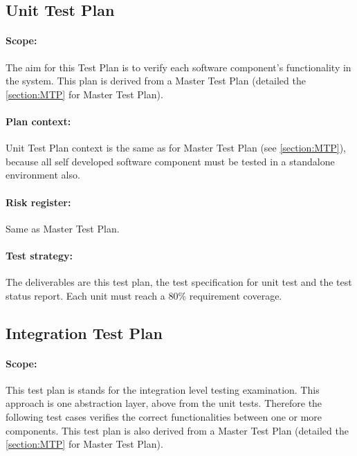 \subsection{Unit Test Plan}\label{ssection:UTP}
\paragraph{Scope:} The aim for this Test Plan is to verify each software component's functionality in the system. This plan is derived from a Master Test Plan (detailed the \autoref{section:MTP} for Master Test Plan). 
\paragraph{Plan context:} Unit Test Plan context is the same as for Master Test Plan (see \autoref{section:MTP}), because all self developed software component must be tested in a standalone environment also. 
\paragraph{Risk register:} Same as Master Test Plan.
\paragraph{Test strategy:} The deliverables are this test plan, the test specification for unit test and the test status report. Each unit must reach a 80\%  requirement coverage. 


\subsection{Integration Test Plan}\label{ssection:ITP}
\paragraph{Scope:} This test plan is stands for the integration level testing examination. This approach is one abstraction layer, above from the unit tests. Therefore the following test cases verifies the correct functionalities between one or more components. This test plan is also derived from a Master Test Plan (detailed the \autoref{section:MTP} for Master Test Plan).
